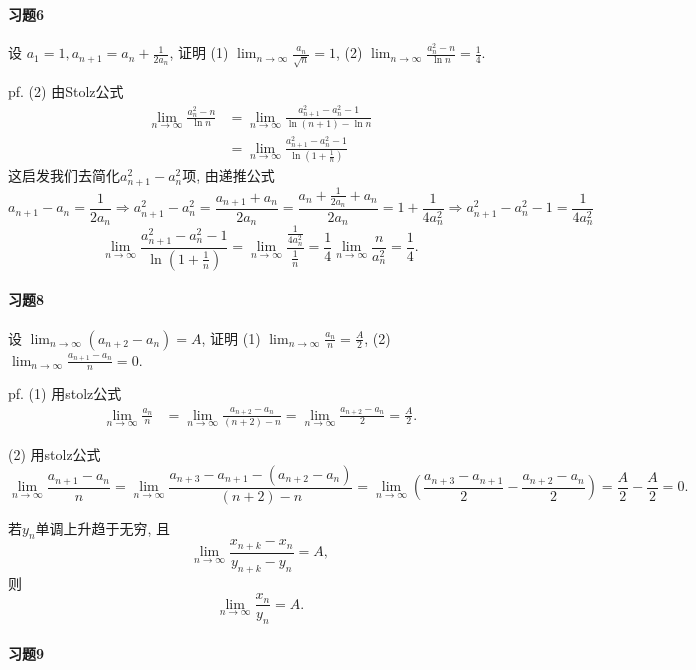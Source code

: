 \paragraph{习题6}

设 $a_{1}=1,a_{n+1}=a_{n}+\frac{1}{2a_{n}}$, 证明 (1) $\lim_{n\rightarrow\infty}\frac{a_{n}}{\sqrt{n}}=1$,
(2) $\lim_{n\rightarrow\infty}\frac{a_{n}^{2}-n}{\ln n}=\frac{1}{4}$.

pf. (2) 由Stolz公式
\begin{align*}
	\lim_{n\to\infty}\frac{a_{n}^{2}-n}{\ln n} & =\lim_{n\to\infty}\frac{a_{n+1}^{2}-a_{n}^{2}-1}{\ln(n+1)-\ln n}\\
	& =\lim_{n\to\infty}\frac{a_{n+1}^{2}-a_{n}^{2}-1}{\ln\left(1+\frac{1}{n}\right)}
\end{align*}
这启发我们去简化$a_{n+1}^{2}-a_{n}^{2}$项, 由递推公式
$$
a_{n+1}-a_{n}=\frac{1}{2a_{n}}\Longrightarrow a_{n+1}^{2}-a_{n}^{2}=\frac{a_{n+1}+a_{n}}{2a_{n}}=\frac{a_{n}+\frac{1}{2a_{n}}+a_{n}}{2a_{n}}=1+\frac{1}{4a_{n}^{2}}\Longrightarrow a_{n+1}^{2}-a_{n}^{2}-1=\frac{1}{4a_{n}^{2}}
$$
$$
\lim_{n\to\infty}\frac{a_{n+1}^{2}-a_{n}^{2}-1}{\ln\left(1+\frac{1}{n}\right)}=\lim_{n\to\infty}\frac{\frac{1}{4a_{n}^{2}}}{\frac{1}{n}}=\frac{1}{4}\lim_{n\to\infty}\frac{n}{a_{n}^{2}}=\frac{1}{4}.
$$


\paragraph{习题8}

设 $\lim_{n\rightarrow\infty}\left(a_{n+2}-a_{n}\right)=A$, 证明 (1)
$\lim_{n\rightarrow\infty}\frac{a_{n}}{n}=\frac{A}{2}$, (2) $\lim_{n\rightarrow\infty}\frac{a_{n+1}-a_{n}}{n}=0$.

pf. (1) 用stolz公式
\begin{align*}
	\lim_{n\to\infty}\frac{a_{n}}{n} & =\lim_{n\to\infty}\frac{a_{n+2}-a_{n}}{(n+2)-n}=\lim_{n\to\infty}\frac{a_{n+2}-a_{n}}{2}=\frac{A}{2}.
\end{align*}

(2) 用stolz公式
$$
\lim_{n\to\infty}\frac{a_{n+1}-a_{n}}{n}=\lim_{n\to\infty}\frac{a_{n+3}-a_{n+1}-(a_{n+2}-a_{n})}{(n+2)-n}=\lim_{n\to\infty}\left(\frac{a_{n+3}-a_{n+1}}{2}-\frac{a_{n+2}-a_{n}}{2}\right)=\frac{A}{2}-\frac{A}{2}=0.
$$

若$y_{n}$单调上升趋于无穷, 且
$$
\lim_{n\to\infty}\frac{x_{n+k}-x_{n}}{y_{n+k}-y_{n}}=A,
$$
则
$$
\lim_{n\to\infty}\frac{x_{n}}{y_{n}}=A.
$$


\paragraph{习题9}

